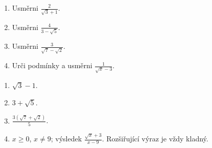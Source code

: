 \documentclass[11pt,a4paper]{article}
\begin{document}
\begin{zadaniReseniBox}[title={Domácí úlohy},breakable=false]
\begin{enumerate}[label=\alph*)]
\item Usměrni $\frac2{\sqrt3+1}$.
\item Usměrni $\frac4{3-\sqrt5}$.
\item Usměrni $\frac3{\sqrt7-\sqrt2}$.
\item Urči podmínky a usměrni $\frac1{\sqrt x-3}$.
\end{enumerate}
\tcblower
\begin{enumerate}[label=\alph*)]
\item $\sqrt3-1$.
\item $3+\sqrt5$.
\item $\frac{3(\sqrt7+\sqrt2)}5$.
\item $x\ge0$, $x\ne9$; výsledek $\frac{\sqrt x+3}{x-9}$. Rozšiřující výraz je vždy kladný.
\end{enumerate}
\end{zadaniReseniBox}
\end{document}
